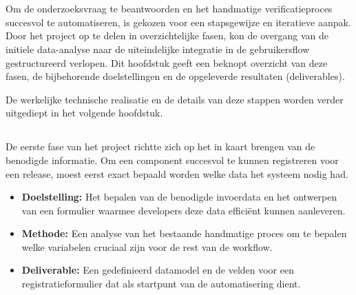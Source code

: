 
\chapter{}%
\label{ch:methodologie}

Om de onderzoeksvraag te beantwoorden en het handmatige verificatieproces succesvol te automatiseren, is gekozen voor een stapsgewijze en iteratieve aanpak. Door het project op te delen in overzichtelijke fasen, kon de overgang van de initiele data-analyse naar de uiteindelijke integratie in de gebruikersflow gestructureerd verlopen. Dit hoofdstuk geeft een beknopt overzicht van deze fasen, de bijbehorende doelstellingen en de opgeleverde resultaten (deliverables). 

De werkelijke technische realisatie en de details van deze stappen worden verder uitgediept in het volgende hoofdstuk.

\section{}%
\label{sec:methode-fase1}

De eerste fase van het project richtte zich op het in kaart brengen van de benodigde informatie. Om een component succesvol te kunnen registreren voor een release, moest eerst exact bepaald worden welke data het systeem nodig had. 

\begin{itemize}
  \item \textbf{Doelstelling:} Het bepalen van de benodigde invoerdata en het ontwerpen van een formulier waarmee developers deze data efficiënt kunnen aanleveren.
  \item \textbf{Methode:} Een analyse van het bestaande handmatige proces om te bepalen welke variabelen cruciaal zijn voor de rest van de workflow.
  \item \textbf{Deliverable:} Een gedefinieerd datamodel en de velden voor een registratieformulier dat als startpunt van de automatisering dient.
\end{itemize}

\section{}%
\label{sec:methode-fase2}

